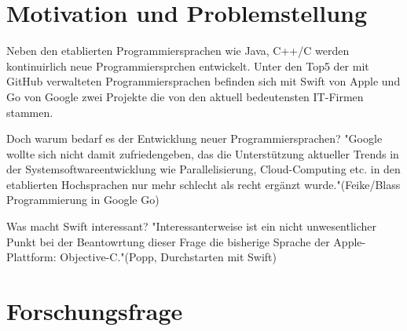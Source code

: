 \documentclass[
    paper=a4,
    bibtotocnumbered,
    liststotocnumbered,
    oneside,
    12pt,
    listof=totoc,
    toc=chapterentrywithdots,
    listof=entryprefix,
]{scrreprt}
\begin{document}

\chapter{Motivation und Problemstellung}
Neben den etablierten Programmiersprachen wie Java, C++/C werden kontinuirlich neue Programmiersprchen entwickelt. 
Unter den Top5 der mit GitHub verwalteten Programmiersprachen befinden sich mit Swift von Apple und Go von Google zwei Projekte die von den aktuell bedeutensten IT-Firmen stammen.



Doch warum bedarf es der Entwicklung neuer Programmiersprachen? "Google wollte sich nicht damit zufriedengeben, das die Unterstützung aktueller Trends in der Systemsoftwareentwicklung wie Parallelisierung, Cloud-Computing etc. in den etablierten Hochsprachen nur mehr schlecht als recht ergänzt wurde."(Feike/Blass Programmierung in Google Go)

Was macht Swift interessant?
"Interessanterweise ist ein nicht unwesentlicher Punkt bei der Beantowrtung dieser Frage die bisherige Sprache der Apple-Plattform: Objective-C."(Popp, Durchstarten mit Swift) 

\chapter{Forschungsfrage}
\blindtext



\end{document}
